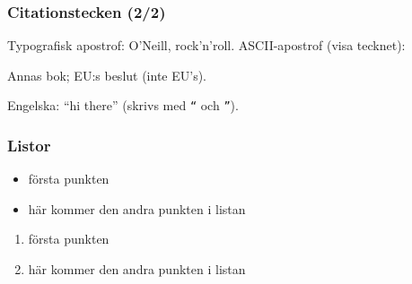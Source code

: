 \begin{frame}[fragile,t]
  \frametitle{Citationstecken (2/2)}


\begin{exlatex}
Typografisk apostrof: O\textquoteright{}Neill, rock\textquoteright n\textquoteright{}roll.
ASCII-apostrof (visa tecknet): \textquotesingle

Annas bok; EU:s beslut (inte EU\textquoteright s).

Engelska: ``hi there'' (skrivs med \texttt{``} och \texttt{''}).
\end{exlatex}

\end{frame}


\begin{frame}[fragile,t]
  \frametitle{Listor}
  \vspace{1em}
  

  \begin{exlatex}
\begin{itemize}
  \item första punkten
  \item här kommer den andra
  punkten i listan
\end{itemize}
  \end{exlatex}

  \blankline

  \begin{exlatex}
\begin{enumerate}
  \item första punkten
  \item här kommer den andra
  punkten i listan
\end{enumerate}
  \end{exlatex}

\end{frame}

